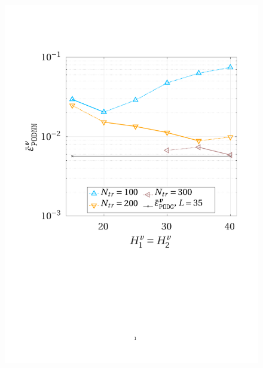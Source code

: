 \documentclass[longtitle]{elsarticle}
\numberwithin{equation}{section}
\theoremstyle{theorem}
\theoremstyle{definition}
\theoremstyle{remark}
\theoremstyle{proposition}
\numberwithin{figure}{section}
\begin{document}
\begin{figure}[h!]
			\includegraphics[scale = 0.37, trim = {1cm 9cm 1.5cm 3.5cm}, clip]{dc_400_vel_nn_convergence}
			\hspace*{1cm}

\end{figure}
\end{document}
